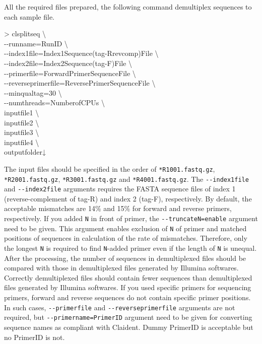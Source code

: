 \documentclass[titlepage,10pt,a4paper,english]{jsbook}
\newenvironment{cmd}{\begin{oframed}\raggedright\ttfamily\footnotesize\setlength{\baselineskip}{1.4em}}{\end{oframed}\vspace{-1em}}
\begin{document}
All the required files prepared, the following command demultiplex sequences to each sample file.

\begin{cmd}
{\textgreater} clsplitseq {\textbackslash}\\
{-}{-}runname=RunID {\textbackslash}\\
{-}{-}index1file=Index1Sequence(tag-Rrevcomp)File {\textbackslash}\\
{-}{-}index2file=Index2Sequence(tag-F)File {\textbackslash}\\
{-}{-}primerfile=ForwardPrimerSequenceFile {\textbackslash}\\
{-}{-}reverseprimerfile=ReversePrimerSequenceFile {\textbackslash}\\
{-}{-}minqualtag=30 {\textbackslash}\\
{-}{-}numthreads=NumberofCPUs {\textbackslash}\\
inputfile1 {\textbackslash}\\
inputfile2 {\textbackslash}\\
inputfile3 {\textbackslash}\\
inputfile4 {\textbackslash}\\
outputfolder↓
\end{cmd}

The input files should be specified in the order of \texttt{*{\textunderscore}R1{\textunderscore}001.fastq.gz}, \texttt{*{\textunderscore}R2{\textunderscore}001.fastq.gz}, \texttt{*{\textunderscore}R3{\textunderscore}001.fastq.gz} and \texttt{*{\textunderscore}R4{\textunderscore}001.fastq.gz}.
The \texttt{{-}{-}index1file} and \texttt{{-}{-}index2file} arguments requires the FASTA sequence files of index 1 (reverse-complement of tag-R) and index 2 (tag-F), respectively.
By default, the acceptable mismatches are 14\% and 15\% for forward and reverse primers, respectively.
If you added \texttt{N} in front of primer, the \texttt{{-}{-}truncateN=enable} argument need to be given.
This argument enables exclusion of \texttt{N} of primer and matched positions of sequences in calculation of the rate of mismatches.
Therefore, only the longest \texttt{N} is required to find \texttt{N}-added primer even if the length of \texttt{N} is unequal.
After the processing, the number of sequences in demultiplexed files should be compared with those in demultiplexed files generated by Illumina softwares.
Correctly demultiplexed files should contain fewer sequences than demultiplexed files generated by Illumina softwares.
If you used specific primers for sequencing primers, forward and reverse sequences do not contain specific primer positions.
In such cases, \texttt{{-}{-}primerfile} and \texttt{{-}{-}reverseprimerfile} arguments are not required, but \texttt{{-}{-}primername=PrimerID} argument need to be given for converting sequence names as compliant with Claident.
Dummy PrimerID is acceptable but no PrimerID is not.
\end{document}
